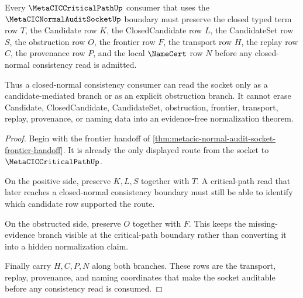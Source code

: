 \begin{theorem}
\label{thm:metacic-critical-path-normal-audit-socket-handoff}
Every $\MetaCICCriticalPathUp$ consumer that uses the $\MetaCICNormalAuditSocketUp$ boundary must preserve the closed typed term row $T$, the Candidate row $K$, the ClosedCandidate row $L$, the CandidateSet row $S$, the obstruction row $O$, the frontier row $F$, the transport row $H$, the replay row $C$, the provenance row $P$, and the local $\NameCert$ row $N$ before any closed-normal consistency read is admitted.

Thus a closed-normal consistency consumer can read the socket only as a candidate-mediated branch or as an explicit obstruction branch. It cannot erase Candidate, ClosedCandidate, CandidateSet, obstruction, frontier, transport, replay, provenance, or naming data into an evidence-free normalization theorem.
\end{theorem}
\begin{proof}
Begin with the frontier handoff of \autoref{thm:metacic-normal-audit-socket-frontier-handoff}. It is already the only displayed route from the socket to $\MetaCICCriticalPathUp$.

On the positive side, preserve $K,L,S$ together with $T$. A critical-path read that later reaches a closed-normal consistency boundary must still be able to identify which candidate row supported the route.

On the obstructed side, preserve $O$ together with $F$. This keeps the missing-evidence branch visible at the critical-path boundary rather than converting it into a hidden normalization claim.

Finally carry $H,C,P,N$ along both branches. These rows are the transport, replay, provenance, and naming coordinates that make the socket auditable before any consistency read is consumed.
\end{proof}



